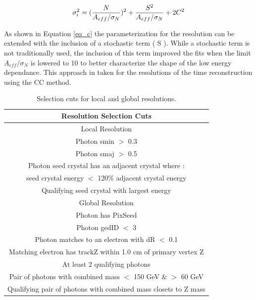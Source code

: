 \begin{equation}
    \sigma^{2}_{i} = (\frac{N}{A_{eff}/\sigma_{N}})^{2} + \frac{S^{2}}{A_{eff}/\sigma_{N}} + 2C^{2}\\
    \label{eq_c}
\end{equation}

As shown in Equation \ref{eq_c} the parameterization for the resolution can be extended with the inclusion of a stochastic term ( S ). While a stochastic term is not traditionally used, the inclusion of this term improved the fits when the limit $A_{eff}/\sigma_{N} $ is lowered to 10 to better characterize the shape of the low energy dependance. This approach in taken for the resolutions of the time reconstruction using the CC method.

\hfill
\begin{table}[h!]
\begin{center}
 \begin{tabular}{ |c| }
 \hline
 Resolution Selection Cuts \\
 \hline
 \hline
 Local Resolution\\
 \hline
  Photon smin $>$ 0.3 \\
  Photon smaj $>$ 0.5 \\
  Photon seed crystal has an adjacent crystal where : \\ 
  seed crystal energy $<$ 120\% adjacent crystal energy \\
  Qualifying seed crystal with largest energy \\
 \hline
 Global Resolution\\
 \hline
  Photon has PixSeed \\
  Photon gedID $<$ 3 \\
  Photon matches to an electron with dR $<$ 0.1  \\
  Matching electron has trackZ within 1.0 cm of primary vertex Z \\
  At least 2 qualifying photons \\
  Pair of photons with combined mass $<$ 150 GeV \& $>$ 60 GeV \\
  Qualifying pair of photons with combined mass closets to Z mass \\
\hline
\end{tabular}
\end{center}
\caption{Selection cuts for local and global resolutions.}
\label{res_params}
\end{table}


